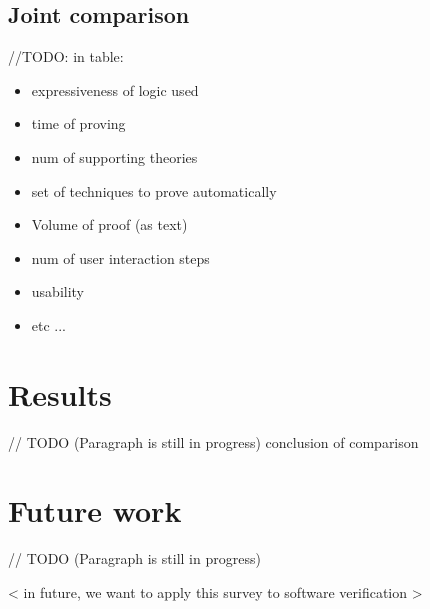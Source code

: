 \documentclass[article]{aaltoseries}
\begin{document}

\subsection{Joint comparison}
\label{sec:joint_comparison}

//TODO: in table:
\begin{itemize}
	\itemsep0em
	\item expressiveness of logic used
	\item time of proving
	\item num of supporting theories
	\item set of techniques to prove automatically
	\item Volume of proof (as text)
	\item num of user interaction steps
	\item usability
	\item etc ...
\end{itemize}


\section{Results}
\label{sec:results}

// TODO (Paragraph is still in progress)
conclusion of comparison


\section{Future work}
\label{sec:future_work}

// TODO (Paragraph is still in progress)

< in future, we want to apply this survey to software verification >






\end{document}
